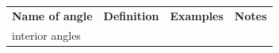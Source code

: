     \setlength\mytablespace{8\tabcolsep}
    \addtolength\mytablespace{5\arrayrulewidth}
    \setlength\mytablewidth{\linewidth}
    \setlength\mytableroom{\mytablewidth}
    \addtolength\mytableroom{-\mytablespace}
    \setlength\myfixedwidth{0pt}
        \addtolength\myfixedwidth{3cm}
    \addtolength\myfixedwidth{3cm}
    \addtolength\myfixedwidth{3cm}
\setlength\mystarwidth{\mytableroom}
        \addtolength\mystarwidth{-\myfixedwidth}
        \divide{}
        \begin{center}
      \label{m39370*uid30}
    \noindent
      \tablelasttail{}
      \begin{xtabular*}{\mytablewidth}[t]{|p{3cm}|p{3cm}|p{3cm}|p{20\mystarwidth}|}\hline
                  \textbf{Name of angle}
                 &
                  \textbf{Definition}
                 &
                  \textbf{Examples}
                 &
                  \textbf{Notes}
     \tabularnewline{}
        interior angles &

\end{xtabular*}
\end{center}
